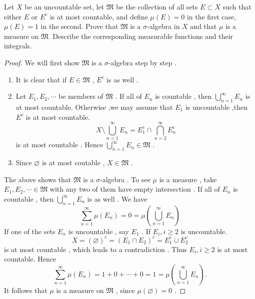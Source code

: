 \documentclass[../main.tex]{subfiles}
\begin{document}
\begin{problem}{}{}
Let $X$ be an uncountable set, let $\mathfrak{M}$ be the collection of all sets $E \subset X$ such that either $E$ or $E^c$ is at most countable, and define $\mu(E) = 0$ in the first case, $\mu(E) = 1$ in the second. Prove that $\mathfrak{M}$ is a $\sigma$-algebra in $X$ and that $\mu$ is a measure on $\mathfrak{M}$. Describe the corresponding measurable functions and their integrals.
\end{problem}

\begin{proof}
    We will first show \(  \mathfrak{M}  \) is  a \(   \sigma   \)-algebra step by step . 
    \begin{enumerate}
        \item It is clear that   if \(  E \in \mathfrak{M}  \) ,  \(  E^{c}  \) is as well .   
        \item Let  \(  E_1,E_2,\cdots   \) be members of \(  \mathfrak{M}  \) . If  all of \(  E_{n}  \) is countable  , then \(  \bigcup _{n = 1}^{\infty}E_{n}  \) is at most countable.    Otherwise ,we may assume that  \(  E_1  \) is uncountable ,then \(  E^{c}  \) is at most countable. \[
        X\setminus \bigcup _{n = 1}^{\infty}E_{n}= E_1^{c}\cap \bigcap_{n = 2}^{\infty} E_{n}^{c}
        \]   is at most countable . Hence \(  \bigcup _{n = 1}^{\infty}E_{n}  \in \mathfrak{M}\) . 
        \item Since \(  \varnothing  \) is at most coutable , \(  X \in \mathfrak{M}  \) . 
    \end{enumerate}
     The above shows that  \(  \mathfrak{M}  \) is a \(   \sigma   \)-algebra . To see \(  \mu   \) is a measure , take \(  E_1,E_2,\cdots  \in \mathfrak{M}  \) with any two of them have empty intersection .  If all of \(  E_{n}  \) is countable ,   then \(  \bigcup _{n = 1}^{\infty}E_{n}  \) is as well . We have \[
     \sum _{n = 1}^{\infty}\mu \left( E_{n} \right)= 0=  \mu \left( \bigcup _{n = 1}^{\infty}E_{n} \right)  
     \]     If one of the sets \(  E_{n}  \) is uncountable , say \(  E_1  \) .  If \(  E_{i} , i\ge 2  \) is uncountable.  \[
    X=  \left( \varnothing \right)^{c}= \left( E_1\cap E_2 \right)^{c}= E_1^{c}\cup E_2^{c}  
     \] is at most countable , which leads to a contradiction .  Thus \(  E_{i} ,i\ge 2  \) is at most countable. Hence \[
     \sum _{n = 1}^{\infty}\mu \left( E_{n} \right)= 1+ 0+ \cdots + 0= 1=  \mu \left( \bigcup _{n = 1}^{\infty}E_{n} \right) .   
     \] It follows that \(  \mu   \) is a measure on \(  \mathfrak{M}  \) , since \(  \mu \left( \varnothing \right)= 0   \) .    


\end{proof}
\end{document}
